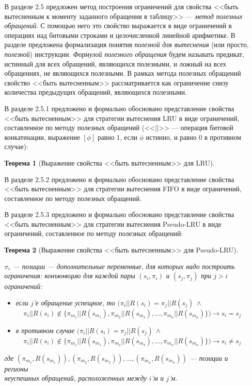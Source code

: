 \documentclass[14pt,autoref,href
,facsimile
]{disser}
\newtheorem{theorem}{Теорема}
\newcommand{\LRU}{LRU\xspace}
\newcommand{\FIFO}{FIFO\xspace}
\newcommand{\PseudoLRU}{Pseudo-LRU\xspace}
\begin{document}
В разделе 2.5 предложен метод построения ограничений для свойства <<быть вытесненным к моменту заданного обращения в таблицу>> --- \emph{метод полезных обращений}. С помощью него это свойство выражается в виде ограничений в операциях над битовыми строками и целочисленной линейной арифметике. В разделе предложена формализация понятия \emph{полезной для вытеснения} (или просто, \emph{полезной}) инструкции. \emph{Формулой полезного обращения} будем называть предикат, истинный для всех обращений, являющихся полезными, и ложный на всех обращениях, не являющихся полезными. В рамках метода полезных обращений свойство <<быть вытесненным>> рассматривается как ограничение снизу количества предыдущих обращений, являющихся полезными.

В разделе 2.5.1 предложено и формально обосновано представление свойства <<быть вытесненным>> для стратегии вытеснения LRU в виде ограничений, составленное по методу полезных обращений (<<||>> --- операция битовой конкатенации, выражение $[\phi]$ равно 1, если $\phi$ истинно, и равно 0 в противном случае):
\begin{theorem}[Выражение свойства <<быть вытесненным>> для \LRU]\label{correct_mirror_LRU} \LRUusefuls
\end{theorem}

В разделе 2.5.2 предложено и формально обосновано представление свойства <<быть вытесненным>> для стратегии вытеснения \FIFO  в виде ограничений, составленное по методу полезных обращений.

В разделе 2.5.3 предложено и формально обосновано представление свойства <<быть вытесненным>> для стратегии вытеснения \PseudoLRU в виде ограничений, составленное по методу полезных обращений:
\begin{theorem}[Выражение свойства <<быть вытесненным>> для \PseudoLRU]\label{correct_mirror_PLRU} \PLRUusefuls

$\pi_i$ --- позиции --- дополнительные переменные, для которых надо построить ограничения:
конъюнкцию для каждой пары $(s_i,\pi_i)$ и $(s_j, \pi_j)$ при $j > i$ ограничений:
\begin{itemize}
    \item если $j$'е обращение успещное, то $(\pi_i||R(s_i) =
\pi_j||R(s_j)~\wedge$ $$\pi_i||R(s_i) \notin \{\pi_{m_1}||R(s_{m_1}),
\pi_{m_2}||R(s_{m_2}), \dots, \pi_{m_n}||R(s_{m_n})\}) \rightarrow s_i = s_j$$
    \item в противном случае $(\pi_i||R(s_i) =
\pi_j||R(s_j)~\wedge$ $$\pi_i||R(s_i) \notin \{\pi_{m_1}||R(s_{m_1}),
\pi_{m_2}||R(s_{m_2}), \dots, \pi_{m_n}||R(s_{m_n})\}) \rightarrow s_i \neq
s_j$$
\end{itemize}
где $(\pi_{m_1},R(s_{m_1})), (\pi_{m_2},R(s_{m_2})), \dots,
(\pi_{m_n},R(s_{m_n}))$ --- позиции и регионы\\неуспешных обращений,
расположенных между $i$'м и $j$'м.
\end{theorem}
\end{document}
